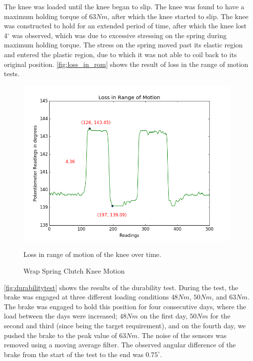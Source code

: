 The knee was loaded until the knee began to slip. The knee was found to have a maximum holding torque of $63Nm$, after which the knee started to slip. The knee was constructed to hold for an extended period of time, after which the knee lost 4$^{\circ}$ was observed, which was due to excessive stressing on the spring during maximum holding torque. The stress on the spring moved past its elastic region and entered the plastic region, due to which it was not able to coil back to its original position. \autoref{fig:loss_in_rom} shows the result of loss in the range of motion tests.
\begin{figure}[h!]
    \centering
    \includegraphics[scale=0.5]{ images/mech_design/loss_in_rom.png}
    \caption{Wrap Spring Clutch Knee Motion}{Loss in range of motion of the knee over time.}
    \label{fig:loss_in_rom}

\end{figure}

\autoref{fig:durabilitytest} shows the results of the durability test. During the test, the brake was engaged at three different loading conditions $48Nm$, $50Nm$, and $63Nm$. The brake was engaged to hold this position for four consecutive days, where the load between the days were increased; $48Nm$ on the first day, $50Nm$ for the second and third (since being the target requirement), and on the fourth day, we pushed the brake to the peak value of $63Nm$. The noise of the sensors was removed using a moving average filter.  The observed angular difference of the brake from the start of the test to the end was $0.75^{\circ}$.

